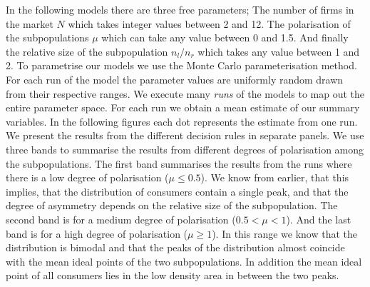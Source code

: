 \documentclass[preprint, 12pt]{elsarticle}
\newcommand*{\TODO}{\textbf{\fbox{??}}}%
\begin{document}
In the following models there are three free parameters; The number of firms in the market $N$ which takes integer values between 2 and 12. The polarisation of the subpopulations $\mu$ which can take any value between 0 and 1.5. And finally the relative size of the subpopulation $n_l/n_r$ which takes any value between 1 and 2. To parametrise our models we use the Monte Carlo parameterisation method. For each run of the model the parameter values are uniformly random drawn from their respective ranges. We execute many \emph{runs} of the models to map out the entire parameter space. For each run we obtain a mean estimate of our summary variables. In the following figures each dot represents the estimate from one run. We present the results from the different decision rules in separate panels. \TODO{We use three bands to summarise the results from different degrees of polarisation among the subpopulations}. The first band summarises the results from the runs where there is a low degree of polarisation ($\mu \le 0.5$). We know from earlier, that this implies, that the distribution of consumers contain a single peak, and that the degree of asymmetry depends on the relative size of the subpopulation. The second band is for a medium degree of polarisation ($0.5 < \mu < 1$). And the last band is for a high degree of polarisation ($\mu \ge 1$). In this range we know that the distribution is bimodal and that the peaks of the distribution almost coincide with the mean ideal points of the two subpopulations. In addition the mean ideal point of all consumers lies in the low density area in between the two peaks.
\end{document}

